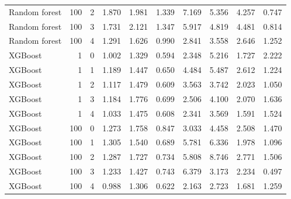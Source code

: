 \documentclass[10pt,a4paper]{article}
\begin{document}
\begin{longtable}{lrrrrrrrrr}
Random forest & 100 & 2 & 1.870 & 1.981 & 1.339 & 7.169 & 5.356 & 4.257 & 0.747 \\
Random forest & 100 & 3 & 1.731 & 2.121 & 1.347 & 5.917 & 4.819 & 4.481 & 0.814 \\
Random forest & 100 & 4 & 1.291 & 1.626 & 0.990 & 2.841 & 3.558 & 2.646 & 1.252 \\
XGBoost & 1 & 0 & 1.002 & 1.329 & 0.594 & 2.348 & 5.216 & 1.727 & 2.222 \\
XGBoost & 1 & 1 & 1.189 & 1.447 & 0.650 & 4.484 & 5.487 & 2.612 & 1.224 \\
XGBoost & 1 & 2 & 1.117 & 1.479 & 0.609 & 3.563 & 3.742 & 2.023 & 1.050 \\
XGBoost & 1 & 3 & 1.184 & 1.776 & 0.699 & 2.506 & 4.100 & 2.070 & 1.636 \\
XGBoost & 1 & 4 & 1.033 & 1.475 & 0.608 & 2.341 & 3.569 & 1.591 & 1.524 \\
XGBoost & 100 & 0 & 1.273 & 1.758 & 0.847 & 3.033 & 4.458 & 2.508 & 1.470 \\
XGBoost & 100 & 1 & 1.305 & 1.540 & 0.689 & 5.781 & 6.336 & 1.978 & 1.096 \\
XGBoost & 100 & 2 & 1.287 & 1.727 & 0.734 & 5.808 & 8.746 & 2.771 & 1.506 \\
XGBoost & 100 & 3 & 1.233 & 1.427 & 0.743 & 6.379 & 3.173 & 2.234 & 0.497 \\
XGBoost & 100 & 4 & 0.988 & 1.306 & 0.622 & 2.163 & 2.723 & 1.681 & 1.259 \\
\bottomrule
\end{longtable}
\end{document}

